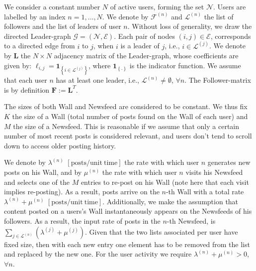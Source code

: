 \documentclass[10pt, conference, letterpaper]{IEEEtran}
\newcommand{\red}[1]{\textcolor{red}{#1}}
\begin{document}

We consider a constant number $N$ of active users, forming the set $\mathcal{N}$. Users are labelled by an index $n=1,\ldots,N$. We denote by $\mathcal{F}^{(n)}$ and $\mathcal{L}^{(n)}$ the list of followers and the list of leaders of user $n$. Without loss of generality, we draw the directed Leader-graph $\mathcal{G}=(\mathcal{N},\mathcal{E})$. Each pair of nodes $(i,j)\in\mathcal{E}$, corresponds to a directed edge from $i$ to $j$, when $i$ is a leader of $j$, i.e., $i\in \mathcal{L}^{(j)}$. We denote by $\mathbf{L}$ the $N\times N$ adjacency matrix of the Leader-graph, whose coefficients are given by: $\ell_{i,j}=\mathbf{1}_{\left\{i\in \mathcal{L}^{(j)}\right\}}$,
where $\mathbf{1}_{\left\{.\right\}}$ is the indicator function. We assume that each user $n$ has at least one leader, i.e., $\mathcal{L}^{(n)} \neq \emptyset$, $\forall n$. %
The Follower-matrix is by definition $\mathbf{F}:=\mathbf{L}^T$.

The sizes of both Wall and Newsfeed are considered to be constant.
We thus fix $K$ the size of a Wall (total number of posts found on the Wall of each user) and $M$ the size of a Newsfeed. This is reasonable if we assume that only a certain number of most recent posts is considered relevant, and users don't tend to scroll down to access older posting history.


We denote by $\lambda^{(n)}$ $\mathrm{[posts/unit~time]}$ the rate with which user $n$ generates new posts on his Wall, and by $\mu^{(n)}$ the rate with which user $n$ visits his Newsfeed and selects one of the $M$ entries to re-post on his Wall (note here that each visit implies re-posting). As a result, posts arrive on the $n$-th Wall with a total rate $\lambda^{(n)}+\mu^{(n)}$ $\mathrm{[posts/unit~time]}$. Additionally, we make the assumption that content posted on a users's Wall instantaneously appears on the Newsfeeds of his followers. As a result,  the input rate of posts in the $n$-th Newsfeed, is $\sum_{j \in \mathcal{L}^{(n)}} ( \lambda^{(j)}+\mu^{(j)})$. Given that the two lists associated per user have fixed size, then with each new entry one element has to be removed from the list and replaced by the new one.
For the user activity we require $\lambda^{(n)}+\mu^{(n)}>0$, $\forall n$. 
\end{document}
